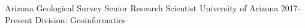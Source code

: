 \begin{cventries}
   \cventry
    {Arizona Geological Survey}
    {Senior Research Scientist}
    {University of Arizona}
    {2017-Present}
    {Division: Geoinformatics}
\end{cventries}